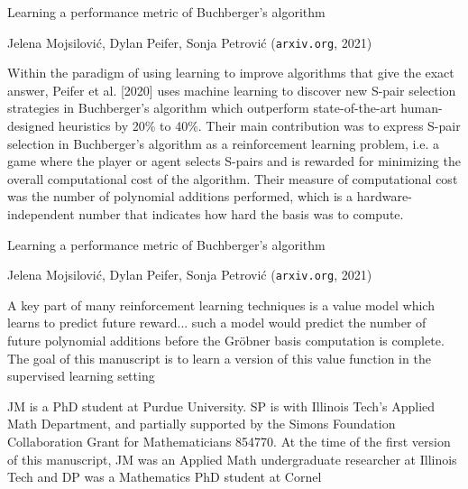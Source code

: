 \documentclass{beamer}
\begin{document}
\begin{frame}

\begin{exampleblock}{Learning a performance metric of Buchberger's algorithm

Jelena Mojsilovi\'c, Dylan Peifer, Sonja Petrovi\'c ({\tt arxiv.org}, 2021)
}
Within the paradigm of using
learning to improve algorithms that give the exact answer, Peifer et al. [2020] uses machine
learning to discover new S-pair selection strategies in Buchberger's algorithm which outperform
state-of-the-art human-designed heuristics by 20\% to 40\%. Their main contribution was
to express S-pair selection in Buchberger's algorithm as a reinforcement learning problem, i.e.
a game where the player or agent selects S-pairs and is rewarded for minimizing the overall
computational cost of the algorithm. Their measure of computational cost was the number
of polynomial additions performed, which is a hardware- independent number that indicates
how hard the basis was to compute.
\end{exampleblock}

\end{frame}

\begin{frame}

\begin{exampleblock}{Learning a performance metric of Buchberger's algorithm

Jelena Mojsilovi\'c, Dylan Peifer, Sonja Petrovi\'c ({\tt arxiv.org}, 2021)
}
A key part of many reinforcement learning techniques
is a value model which learns to predict future reward...
such a model would predict the number of future polynomial
additions before the Gr\"obner basis computation is complete. The goal of this manuscript is
to learn a version of this value function in the supervised learning setting
\end{exampleblock}

\begin{exampleblock}{}
JM is a PhD student at Purdue University. SP is with Illinois Tech's Applied Math Department, and
partially supported by the Simons Foundation Collaboration Grant for Mathematicians 854770. At the time
of the first version of this manuscript, JM was an Applied Math undergraduate researcher at Illinois Tech and
DP was a Mathematics PhD student at Cornel
\end{exampleblock}

\end{frame}
\end{document}
